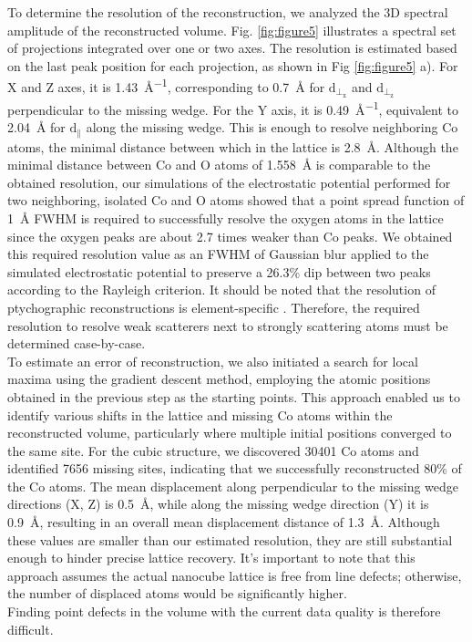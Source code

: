 \documentclass[12pt]{iopart}
\begin{document}
To determine the resolution of the reconstruction, we analyzed the 3D spectral amplitude of the reconstructed volume. Fig. \ref{fig:figure5} illustrates a spectral set of projections integrated over one or two axes. The resolution is estimated based on the last peak position for each projection, as shown in Fig \ref{fig:figure5} a). For X and Z axes, it is \SI{1.43}{\angstrom^{-1}}, corresponding to \SI{0.7}{\angstrom} for $\mathrm{d_{\perp_x}}$ and $\mathrm{d_{\perp_ z}}$ perpendicular to the missing wedge. For the Y axis, it is \SI{0.49}{\angstrom^{-1}}, equivalent to \SI{2.04}{\angstrom} for $\mathrm{d_{\parallel}}$ along the missing wedge. This is enough to resolve neighboring Co atoms, the minimal distance between which in the lattice is \SI{2.8}{\angstrom}. Although the minimal distance between Co and O atoms of \SI{1.558}{\angstrom} is comparable to the obtained resolution, our simulations of the electrostatic potential performed for two neighboring, isolated Co and O atoms showed that a point spread function of \SI{1}{\angstrom} FWHM is required to successfully resolve the oxygen atoms in the lattice since the oxygen peaks are about 2.7 times weaker than Co peaks. We obtained this required resolution value as an FWHM of Gaussian blur applied to the simulated electrostatic potential to preserve a 26.3\% dip between two peaks according to the Rayleigh criterion. It should be noted that the resolution of ptychographic reconstructions is element-specific \cite{chen2021electron}. Therefore, the required resolution to resolve weak scatterers next to strongly scattering atoms must be determined case-by-case. \\
To estimate an error of reconstruction, we also initiated a search for local maxima using the gradient descent method, employing the atomic positions obtained in the previous step as the starting points. This approach enabled us to identify various shifts in the lattice and missing Co atoms within the reconstructed volume, particularly where multiple initial positions converged to the same site. For the cubic structure, we discovered 30401 Co atoms and identified 7656 missing sites, indicating that we successfully reconstructed 80\% of the Co atoms. The mean displacement along perpendicular to the missing wedge directions (X, Z) is \SI{0.5}{\angstrom}, while along the missing wedge direction (Y) it is \SI{0.9}{\angstrom}, resulting in an overall mean displacement distance of \SI{1.3}{\angstrom}. Although these values are smaller than our estimated resolution, they are still substantial enough to hinder precise lattice recovery. It's important to note that this approach assumes the actual nanocube lattice is free from line defects; otherwise, the number of displaced atoms would be significantly higher.\\
Finding point defects in the volume with the current data quality is therefore difficult. 
\end{document}
